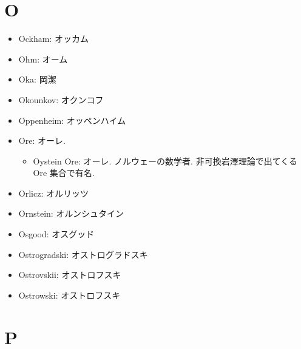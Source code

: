 \documentclass[openany, a4paper, oneside]{jsbook}
\begin{document}
\section{O}

\begin{itemize}
\item Ockham: オッカム
\item Ohm: オーム
\item Oka: 岡潔
\item Okounkov: オクンコフ
\item Oppenheim: オッペンハイム
\item Ore: オーレ.
\begin{itemize}
\item Oystein Ore: オーレ. ノルウェーの数学者. 非可換岩澤理論で出てくる Ore 集合で有名.
\end{itemize}
\item Orlicz: オルリッツ
\item Ornstein: オルンシュタイン
\item Osgood: オスグッド
\item Ostrogradski: オストログラドスキ
\item Ostrovskii: オストロフスキ
\item Ostrowski: オストロフスキ
\end{itemize}
\section{P}
\end{document}
